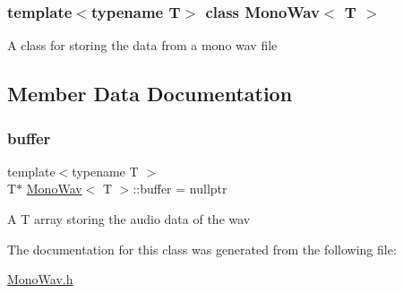 \subsubsection*{template$<$typename T$>$\newline
class Mono\+Wav$<$ T $>$}

A class for storing the data from a mono wav file 

\subsection{Member Data Documentation}
\mbox{\label{classMonoWav_a5ca6f817d4a63a7688e0781bb40e4570}} 
\subsubsection{\texorpdfstring{buffer}{buffer}}
{\footnotesize\ttfamily template$<$typename T $>$ \\
T$\ast$ \hyperlink{classMonoWav}{Mono\+Wav}$<$ T $>$\+::buffer = nullptr\hspace{0.3cm}{\ttfamily [private]}}

A T array storing the audio data of the wav 

The documentation for this class was generated from the following file\+:\begin{DoxyCompactItemize}
\item 
\hyperlink{MonoWav_8h}{Mono\+Wav.\+h}\end{DoxyCompactItemize}
